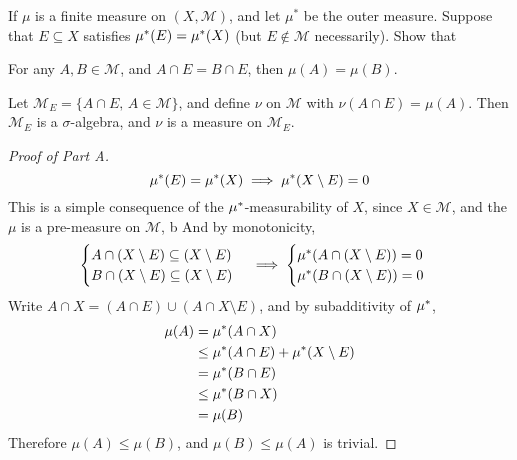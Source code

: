\documentclass[../../main.tex]{subfiles}
\begin{document}
\newpage
{}
\begin{wts}
    If $\mu$ is a finite measure on $(X,\mathcal{M})$, and let $\mu^*$ be the outer measure. Suppose that $E\subseteq X$ satisfies $\mu^*(E)=\mu^*(X)$ (but $E\notin \mathcal{M}$ necessarily). Show that
    \begin{enumalpha}
        \item For any $A,B\in\mathcal{M}$, and $A\cap E = B\cap E$, then $\mu(A)=\mu(B)$.
        \item Let $\mathcal{M}_E=\{A\cap E,\,A\in\mathcal{M}\}$, and define $\nu$ on $\mathcal{M}$ with $\nu(A\cap E)=\mu(A)$. Then $\mathcal{M}_E$ is a $\sigma$-algebra, and $\nu$ is a measure on $\mathcal{M}_E$.
    \end{enumalpha}
\end{wts}
\begin{proof}[Proof of Part A]
\[
\mu^*(E)=\mu^*(X)\implies \mu^*(X\setminus E)=0
\]
This is a simple consequence of the $\mu^*$-measurability of $X$, since $X\in\mathcal{M}$, and the $\mu$ is a pre-measure on $\mathcal{M}$, b
And by monotonicity, 
\[
\begin{cases}A\cap (X\setminus E)\subseteq (X\setminus E)\\ B\cap (X\setminus E)\subseteq (X\setminus E)\end{cases}\implies\begin{cases}\mu^*(A\cap (X\setminus E))=0\\
\mu^*(B\cap (X\setminus E))=0\end{cases}
\]
Write $A\cap X = (A\cap E)\cup (A\cap X\setminus E)$, and by subadditivity of $\mu^*$,
\begin{align*}
\mu(A)&=\mu^*(A\cap X)\\
&\leq \mu^*(A\cap E)+\mu^*(X\setminus E)\\
&=\mu^*(B\cap E)\\
&\leq \mu^*(B\cap X)\\
&=\mu(B)
\end{align*}
Therefore $\mu(A)\leq \mu(B)$, and $\mu(B)\leq \mu(A)$ is trivial. 

\end{proof}
\end{document}
